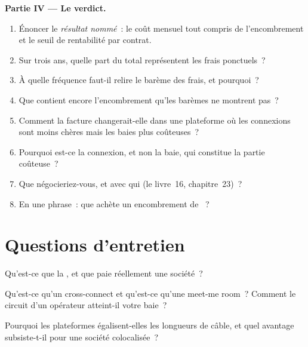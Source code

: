 \begin{problem}
\medskip\noindent\textbf{Partie IV --- Le verdict.}
\begin{enumerate}[resume]
\item Énoncer le \emph{résultat nommé}~: le coût mensuel tout compris de l'encombrement et le seuil de rentabilité par contrat.
\item Sur trois ans, quelle part du total représentent les frais ponctuels~?
\item À quelle fréquence faut-il relire le barème des frais, et pourquoi~?
\item Que contient encore l'encombrement qu'les barèmes ne montrent pas~?
\item Comment la facture changerait-elle dans une plateforme où les connexions sont moins chères mais les baies plus coûteuses~?
\item Pourquoi est-ce la connexion, et non la baie, qui constitue la partie coûteuse~?
\item Que négocieriez-vous, et avec qui (le livre~16, chapitre~23)~?
\item En une phrase~: que achète un encombrement de ~?
\end{enumerate}
\end{problem}

\section{Questions d'entretien}

\begin{interviewq}\label{iq:nw:colocation-products-and-how-they-are-sold:1}
Qu'est-ce que la , et que paie réellement une société~?
\end{interviewq}

\begin{interviewq}\label{iq:nw:colocation-products-and-how-they-are-sold:2}
Qu'est-ce qu'un cross-connect et qu'est-ce qu'une meet-me room~? Comment le circuit d'un opérateur atteint-il votre baie~?
\end{interviewq}

\begin{interviewq}\label{iq:nw:colocation-products-and-how-they-are-sold:3}
Pourquoi les plateformes égalisent-elles les longueurs de câble, et quel avantage subsiste-t-il pour une société colocalisée~?
\end{interviewq}


